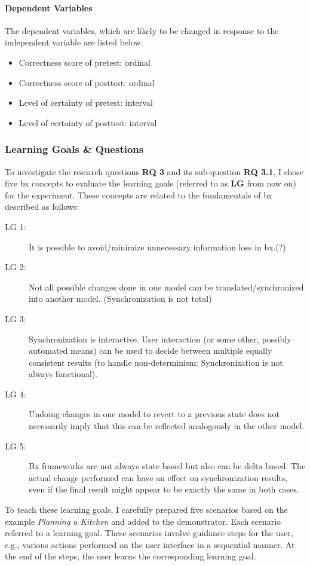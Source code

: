 \paragraph{Dependent Variables} The dependent variables, which are likely to be changed in response to the independent variable are listed below:

\begin{itemize}
	\item Correctness score of pretest: ordinal
	\item Correctness score of posttest: ordinal
	\item Level of certainty of pretest:  interval
	\item Level of certainty of posttest: interval
\end{itemize}

\subsubsection{Learning Goals \& Questions}\label{subsubsec:questions}
To investigate the research questions \textbf{RQ 3} and its sub-question \textbf{RQ 3.1}, I chose five bx concepts to evaluate the learning goals (referred to as \textbf{LG} from now on) for the experiment. These concepts are related to the fundamentals of bx described as follows:
\begin{description}
	\item[LG 1:] It is possible to avoid/minimize unnecessary information loss in bx.(?)
	\item[LG 2:] Not all possible changes done in one model can be translated/synchronized into another model. (Synchronization is not total)
	\item[LG 3:] Synchronization is interactive. User interaction (or some other, possibly automated means) can be used to decide between multiple equally consistent results (to handle non-determinism: Synchronization is not always functional). 
	\item[LG 4:] Undoing changes in one model to revert to a previous state does not necessarily imply that this can be reflected analogously in the other model. 
	\item[LG 5:] Bx frameworks are not always state based but also can be delta based. The actual change performed can have an effect on synchronization results, even if the final result might appear to be exactly the same in both cases. 
\end{description}

To teach these learning goals, I carefully prepared five scenarios based on the example \textit{Planning a Kitchen} and added to the demonstrator. Each scenario referred to a learning goal. These scenarios involve guidance steps for the user, e.g., various actions performed on the user interface in a sequential manner. At the end of the steps, the user learns the corresponding learning goal.

